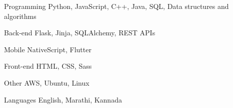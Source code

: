 

\begin{cvskills}

  \cvskill
    {Programming} %
    {Python, JavaScript, C++, Java, SQL, Data structures and algorithms} %

  \cvskill
    {Back-end} %
    {Flask, Jinja, SQLAlchemy, REST APIs} %
    
  \cvskill
    {Mobile} %
    {NativeScript, Flutter} %

  \cvskill
    {Front-end} %
    {HTML, CSS, Sass} %
    
  \cvskill
    {Other} %
    {AWS, Ubuntu, Linux} %
    


  \cvskill
    {Languages} %
    {English, Marathi, Kannada} %

\end{cvskills}
